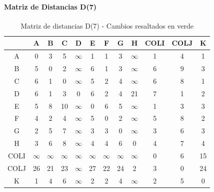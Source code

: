 \documentclass[12pt]{article}
\begin{document}
\paragraph{Matriz de Distancias D(7)}
\begin{table}[h!]
\centering
\begin{tabular}{|c|c|c|c|c|c|c|c|c|c|c|c|}
\hline
 & A & B & C & D & E & F & G & H & COLI & COLJ & K \\\hline
A & 0 & 3 & 5 & $\infty$ & 1 & 1 & 3 & $\infty$ & 1 & 4 & 1 \\\hline
B & \cellcolor{lightgreen} 5 & 0 & 2 & $\infty$ & \cellcolor{lightgreen} 6 & 1 & 3 & $\infty$ & \cellcolor{lightgreen} 6 & \cellcolor{lightgreen} 9 & 3 \\\hline
C & \cellcolor{lightgreen} 6 & 1 & 0 & $\infty$ & 5 & 2 & 4 & $\infty$ & 6 & 8 & 1 \\\hline
D & \cellcolor{lightgreen} 6 & 1 & 3 & 0 & 6 & 2 & 4 & 21 & 7 & 1 & 2 \\\hline
E & 5 & 8 & 10 & $\infty$ & 0 & 6 & 5 & $\infty$ & 1 & 3 & 3 \\\hline
F & \cellcolor{lightgreen} 4 & 2 & 4 & $\infty$ & \cellcolor{lightgreen} 5 & 0 & 2 & $\infty$ & \cellcolor{lightgreen} 5 & \cellcolor{lightgreen} 8 & 2 \\\hline
G & 2 & 5 & 7 & $\infty$ & 3 & 3 & 0 & $\infty$ & 3 & 6 & 3 \\\hline
H & 3 & 6 & 8 & $\infty$ & 4 & 4 & 6 & 0 & 4 & 7 & 4 \\\hline
COLI & $\infty$ & $\infty$ & $\infty$ & $\infty$ & $\infty$ & $\infty$ & $\infty$ & $\infty$ & 0 & 6 & 15 \\\hline
COLJ & \cellcolor{lightgreen} 26 & 21 & 23 & $\infty$ & \cellcolor{lightgreen} 27 & 22 & 24 & 2 & 3 & 0 & 24 \\\hline
K & 1 & 4 & 6 & $\infty$ & 2 & 2 & 4 & $\infty$ & 2 & 5 & 0 \\\hline
\end{tabular}
\caption{Matriz de distancias D(7) - Cambios resaltados en verde}
\end{table}
\end{document}
